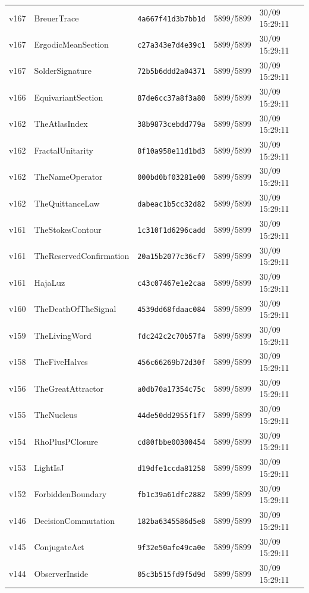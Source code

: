 \documentclass[11pt]{article}
\theoremstyle{definition}\newtheorem{deriv}{Derivation}
\begin{document}
{\begin{longtable}{@{}lllll@{}}
v167 & BreuerTrace & \texttt{4a667f41d3b7bb1d} & 5899/5899 & 30/09 15:29:11 \\
v167 & ErgodicMeanSection & \texttt{c27a343e7d4e39c1} & 5899/5899 & 30/09 15:29:11 \\
v167 & SolderSignature & \texttt{72b5b6ddd2a04371} & 5899/5899 & 30/09 15:29:11 \\
v166 & EquivariantSection & \texttt{87de6cc37a8f3a80} & 5899/5899 & 30/09 15:29:11 \\
v162 & TheAtlasIndex & \texttt{38b9873cebdd779a} & 5899/5899 & 30/09 15:29:11 \\
v162 & FractalUnitarity & \texttt{8f10a958e11d1bd3} & 5899/5899 & 30/09 15:29:11 \\
v162 & TheNameOperator & \texttt{000bd0bf03281e00} & 5899/5899 & 30/09 15:29:11 \\
v162 & TheQuittanceLaw & \texttt{dabeac1b5cc32d82} & 5899/5899 & 30/09 15:29:11 \\
v161 & TheStokesContour & \texttt{1c310f1d6296cadd} & 5899/5899 & 30/09 15:29:11 \\
v161 & TheReservedConfirmation & \texttt{20a15b2077c36cf7} & 5899/5899 & 30/09 15:29:11 \\
v161 & HajaLuz & \texttt{c43c07467e1e2caa} & 5899/5899 & 30/09 15:29:11 \\
v160 & TheDeathOfTheSignal & \texttt{4539dd68fdaac084} & 5899/5899 & 30/09 15:29:11 \\
v159 & TheLivingWord & \texttt{fdc242c2c70b57fa} & 5899/5899 & 30/09 15:29:11 \\
v158 & TheFiveHalves & \texttt{456c66269b72d30f} & 5899/5899 & 30/09 15:29:11 \\
v156 & TheGreatAttractor & \texttt{a0db70a17354c75c} & 5899/5899 & 30/09 15:29:11 \\
v155 & TheNucleus & \texttt{44de50dd2955f1f7} & 5899/5899 & 30/09 15:29:11 \\
v154 & RhoPlusPClosure & \texttt{cd80fbbe00300454} & 5899/5899 & 30/09 15:29:11 \\
v153 & LightIsJ & \texttt{d19dfe1ccda81258} & 5899/5899 & 30/09 15:29:11 \\
v152 & ForbiddenBoundary & \texttt{fb1c39a61dfc2882} & 5899/5899 & 30/09 15:29:11 \\
v146 & DecisionCommutation & \texttt{182ba6345586d5e8} & 5899/5899 & 30/09 15:29:11 \\
v145 & ConjugateAct & \texttt{9f32e50afe49ca0e} & 5899/5899 & 30/09 15:29:11 \\
v144 & ObserverInside & \texttt{05c3b515fd9f5d9d} & 5899/5899 & 30/09 15:29:11 \\

\end{longtable}}
\end{document}

